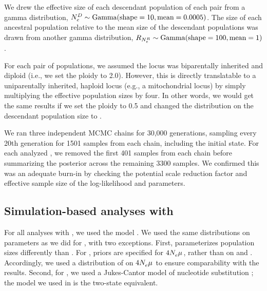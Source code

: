 We drew the effective size of each descendant population of each pair
from a gamma distribution,
$\epopsize[\descendantpopindex{}] \sim \dgamma{10}{0.0005}$.
The size of each ancestral population relative to the mean
size of the descendant populations was drawn from
another gamma distribution,
$\rootrelativepopsize \sim \dgamma{100}{1}$.

For each pair of populations, we assumed the locus was biparentally inherited
and diploid (i.e., we set the ploidy to 2.0).
However, this is directly translatable to a uniparentally inherited, haploid
locus (e.g., a mitochondrial locus) by simply multiplying the effective
population sizes by four.
In other words, we would get the same results if we set the ploidy to 0.5 and
changed the distribution on the descendant population size to
.

We ran three independent MCMC chains for 30,000 generations, sampling every
20th generation for 1501 samples from each chain, including the initial state.
For each analyzed \dataset, we removed the first 401 samples from each chain
before summarizing the posterior across the remaining 3300 samples.
We confirmed this was an adequate burn-in by checking the potential scale
reduction factor \citep[PSRF; the square root of Equation 1.1 in][]{Brooks1998}
and effective sample size \citep[ESS;][]{Gong2014} of the log-likelihood and
parameters.

\subsection{Simulation-based analyses with \pymsbayes}

For all analyses with \pymsbayes, we used the \dppmsbayes model
\citep{Oaks2014dpp}.
We used the same distributions on parameters as we did for \ecoevolity, with
two exceptions.
First, \dppmsbayes parameterizes population sizes differently than \ecoevolity.
For \dppmsbayes, priors are specified for $4\epopsize{}\murate{}$, rather than
on \epopsize{} and \murate{}.
Accordingly, we used a distribution of  on
$4\epopsize{}\murate{}$ to ensure comparability with the \ecoevolity results.
Second, for \dppmsbayes, we used a Jukes-Cantor model of nucleotide
substitution \citep{JC1969}; the model we used in \ecoevolity is the two-state
equivalent.

